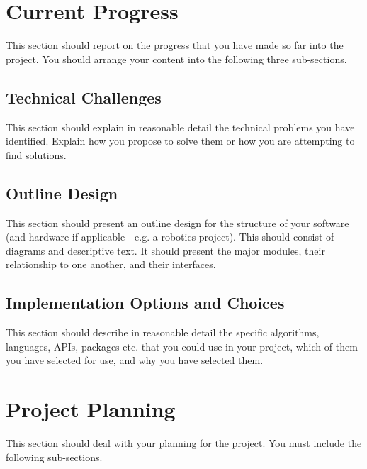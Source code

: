 \documentclass[11pt,fleqn,twoside]{article}
\begin{document}
\section{Current Progress}
This section should report on the progress that you have made so far into the project. You should arrange your content into the following three sub-sections.

\subsection{Technical Challenges}
This section should explain in reasonable detail the technical problems you have identified. Explain how you propose to solve them or how you are attempting to find solutions.

\subsection{Outline Design}
This section should present an outline design for the structure of your software (and hardware if applicable - e.g. a robotics project). This should consist of diagrams and descriptive text. It should present the major modules, their relationship to one another, and their interfaces.

\subsection{Implementation Options and Choices}
This section should describe in reasonable detail the specific algorithms, languages, APIs, packages etc. that you could use in your project, which of them you have selected for use, and why you have selected them.

\section{Project Planning}
This section should deal with your planning for the project. You must include the following sub-sections.
\end{document}
